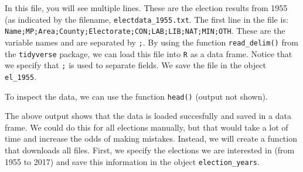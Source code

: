 \documentclass[12pt,oneside]{reedthesis}
\theoremstyle{definition}
\theoremstyle{definition}
\theoremstyle{definition}
\theoremstyle{remark}
\begin{document}
  In this file, you will see multiple lines. These are the election
  results from 1955 (as indicated by the filename,
  \texttt{electdata\_1955.txt}. The first line in the file is:
  \texttt{Name;MP;Area;County;Electorate;CON;LAB;LIB;NAT;MIN;OTH}. These
  are the variable names and are separated by \texttt{;}. By using the
  function \texttt{read\_delim()} from the \texttt{tidyverse} package, we
  can load this file into \texttt{R} as a data frame. Notice that we
  specify that \texttt{;} is used to separate fields. We save the file in
  the object \texttt{el\_1955}.
  \begin{Shaded}
  \begin{Highlighting}[]
  \NormalTok{ <-}\StringTok{ }\NormalTok{(}
    \NormalTok{, }
     
  \NormalTok{  )}
  \end{Highlighting}
  \end{Shaded}
  To inspect the data, we can use the function \texttt{head()} (output not
  shown).
  \begin{Shaded}
  \begin{Highlighting}[]
  \NormalTok{)}
  \end{Highlighting}
  \end{Shaded}
  The above output shows that the data is loaded succesfully and saved in
  a data frame. We could do this for all elections manually, but that
  would take a lot of time and increase the odds of making mistakes.
  Instead, we will create a function that downloads all files. First, we
  specify the elections we are interested in (from 1955 to 2017) and save
  this information in the object \texttt{election\_years}.
  \begin{Shaded}
  \begin{Highlighting}[]
  \StringTok{ }\NormalTok{(}\NormalTok{, }\NormalTok{, }\NormalTok{, }\NormalTok{, }\NormalTok{, }\NormalTok{,}
  \NormalTok{, }\NormalTok{, }\NormalTok{, }\NormalTok{, }\NormalTok{, }\NormalTok{,}
  \NormalTok{, }\NormalTok{, }\NormalTok{, }\NormalTok{, }\NormalTok{)}
  \end{Highlighting}
  \end{Shaded}
\end{document}
